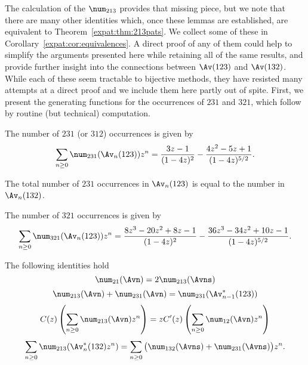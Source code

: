 \documentclass[12pt,twoside]{memoir}
\begin{document}
      The calculation of the $\num_{213}$ provides that missing piece, but we
      note that there are many other identities which, once these lemmas are
      established, are equivalent to Theorem~\ref{expat:thm:213pats}. We collect
      some of these in Corollary~\ref{expat:cor:equivalences}. A direct proof of
      any of them could help to simplify the arguments presented here while
      retaining all of the same results, and provide further insight into the
      connections between $\Av(123)$ and $\Av(132)$. While each of these
      seem tractable to bijective methods, they have resisted many attempts at a
      direct proof  and we include them here partly out of spite.
      First, we present the generating functions for the occurrences of $231$ and
      $321$, which follow by routine (but technical) computation. 
      
      

      \begin{theorem} \label{expat:thm:231pats}
        The number of $231$ (or $312$) occurrences is given by 
        $$\sum_{n \geq 0} \num_{231}(\Av_n(123)) z^n=
        \frac{3z-1}{(1-4z)^{2}} - \frac{4z^2 - 5z + 1}{(1-4z)^{5/2}}.$$
      \end{theorem}

      \begin{corollary} \label{expat:cor:bridge}
        The total number of $231$ occurrences in $\Av_n(123)$ is equal to the
        number in $\Av_n(132)$. 
      \end{corollary}

      \begin{theorem}
        The number of $321$ occurrences is given by 
        $$
          \sum_{n\geq 0} \num_{321}(\Av_n (123)) z^n =
          \frac{ 8z^3 - 20z^2 + 8z - 1}{(1-4z)^{2}}
          - \frac{36z^3 - 34z^2 + 10z - 1}{(1-4z)^{5/2}}.
        $$
      \end{theorem}


      \begin{corollary} \label{expat:cor:equivalences}
        The following identities hold 
        $$ \num_{21}(\Avn) = 2\num_{213}(\Avns) $$
        $$ \num_{213}(\Avn) + \num_{231}(\Avn) = \num_{231} (\Av
        _{n-1}^*(123))$$
        $$ C(z) \left(\sum_{n\geq 0} \num_{213}(\Avn) z^n \right) =
          z C'(z) \left(\sum_{n \geq 0} \num_{12}(\Avn)z^n \right) $$
        $$ \sum_{n\geq 0} \num_{213} (\Av_n^* (132)  z^n) =
          \sum_{n \geq 0} \big(\num_{132}(\Avns) +
          \num_{231}(\Avns)\big)z^n. $$
      \end{corollary}
\end{document}
